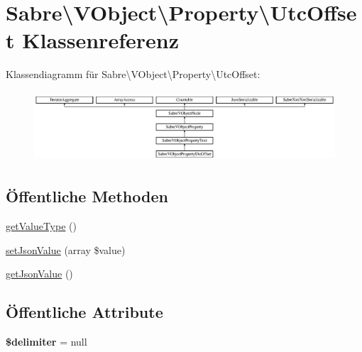 \hypertarget{class_sabre_1_1_v_object_1_1_property_1_1_utc_offset}{}\section{Sabre\textbackslash{}V\+Object\textbackslash{}Property\textbackslash{}Utc\+Offset Klassenreferenz}
\label{class_sabre_1_1_v_object_1_1_property_1_1_utc_offset}
Klassendiagramm für Sabre\textbackslash{}V\+Object\textbackslash{}Property\textbackslash{}Utc\+Offset\+:\begin{figure}[H]
\begin{center}
\leavevmode
\includegraphics[height=2.629108cm]{class_sabre_1_1_v_object_1_1_property_1_1_utc_offset}
\end{center}
\end{figure}
\subsection*{Öffentliche Methoden}
\begin{DoxyCompactItemize}
\item 
\mbox{\hyperlink{class_sabre_1_1_v_object_1_1_property_1_1_utc_offset_aad566e796a99fa28176851b6f9b66a4d}{get\+Value\+Type}} ()
\item 
\mbox{\hyperlink{class_sabre_1_1_v_object_1_1_property_1_1_utc_offset_a5c2436bb3c0829ff59902293ee260089}{set\+Json\+Value}} (array \$value)
\item 
\mbox{\hyperlink{class_sabre_1_1_v_object_1_1_property_1_1_utc_offset_a2790c9c50e69f36bf9701b8fd8397c3b}{get\+Json\+Value}} ()
\end{DoxyCompactItemize}
\subsection*{Öffentliche Attribute}
\begin{DoxyCompactItemize}
\item 
\mbox{\label{class_sabre_1_1_v_object_1_1_property_1_1_utc_offset_a793bb63a388ebd602fe5da250e2a2ec6}} 
{\bfseries \$delimiter} = null
\end{DoxyCompactItemize}
